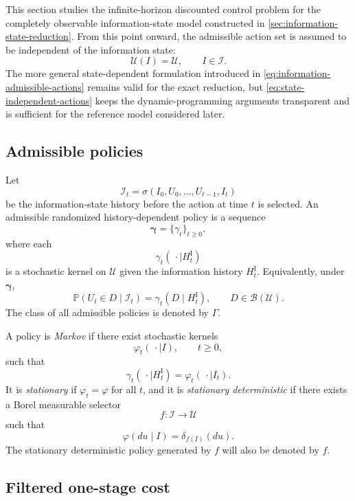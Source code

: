 \documentclass[10pt,twocolumn]{article}
\theoremstyle{remark}
\newcommand{\Pp}{\mathbb{P}}
\newcommand{\B}{\mathcal{B}}
\newcommand{\Ucal}{\mathcal{U}}
\newcommand{\Ical}{\mathcal{I}}
\begin{document}
This section studies the infinite-horizon discounted control problem for the completely observable information-state model constructed in \cref{sec:information-state-reduction}. From this point onward, the admissible action set is assumed to be independent of the information state:
\begin{equation}
	\Ucal(I)=\Ucal,
	\qquad I\in\Ical.
	\label{eq:state-independent-actions}
\end{equation}
The more general state-dependent formulation introduced in \cref{eq:information-admissible-actions} remains valid for the exact reduction, but \cref{eq:state-independent-actions} keeps the dynamic-programming arguments transparent and is sufficient for the reference model considered later.

\subsection{Admissible policies}
\label{subsec:discounted-admissible-policies}

Let
\[
\mathscr I_t
=\sigma(I_0,U_0,\ldots,U_{t-1},I_t)
\]
be the information-state history before the action at time \(t\) is selected. An admissible randomized history-dependent policy is a sequence
\[
\boldsymbol\gamma
=\{\gamma_t\}_{t\geq0},
\]
where each
\[
\gamma_t(\,\cdot\mid H_t^{\mathrm I})
\]
is a stochastic kernel on \(\Ucal\) given the information history \(H_t^{\mathrm I}\). Equivalently, under \(\boldsymbol\gamma\),
\begin{equation*}
	\Pp(U_t\in D\mid\mathscr I_t)
	=\gamma_t(D\mid H_t^{\mathrm I}),
	\qquad D\in\B(\Ucal).
	\label{eq:history-policy}
\end{equation*}
The class of all admissible policies is denoted by \(\Gamma\).

A policy is \emph{Markov} if there exist stochastic kernels
\[
\varphi_t(\,\cdot\mid I),
\qquad t\geq0,
\]
such that
\[
\gamma_t(\,\cdot\mid H_t^{\mathrm I})
=\varphi_t(\,\cdot\mid I_t).
\]
It is \emph{stationary} if \(\varphi_t=\varphi\) for all \(t\), and it is \emph{stationary deterministic} if there exists a Borel measurable selector
\[
f:\Ical\longrightarrow\Ucal
\]
such that
\[
\varphi(du\mid I)=\delta_{f(I)}(du).
\]
The stationary deterministic policy generated by \(f\) will also be denoted by \(f\).

\subsection{Filtered one-stage cost}
\label{subsec:filtered-stage-cost}
\end{document}
